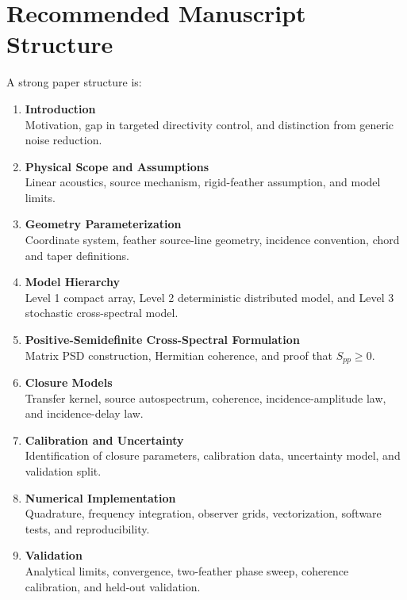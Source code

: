 \documentclass[11pt]{article}
\begin{document}
\section{Recommended Manuscript Structure}

A strong paper structure is:

\begin{enumerate}
    \item \textbf{Introduction}\\
    Motivation, gap in targeted directivity control, and distinction from generic noise reduction.

    \item \textbf{Physical Scope and Assumptions}\\
    Linear acoustics, source mechanism, rigid-feather assumption, and model limits.

    \item \textbf{Geometry Parameterization}\\
    Coordinate system, feather source-line geometry, incidence convention, chord and taper definitions.

    \item \textbf{Model Hierarchy}\\
    Level 1 compact array, Level 2 deterministic distributed model, and Level 3 stochastic cross-spectral model.

    \item \textbf{Positive-Semidefinite Cross-Spectral Formulation}\\
    Matrix PSD construction, Hermitian coherence, and proof that $S_{pp}\geq0$.

    \item \textbf{Closure Models}\\
    Transfer kernel, source autospectrum, coherence, incidence-amplitude law, and incidence-delay law.

    \item \textbf{Calibration and Uncertainty}\\
    Identification of closure parameters, calibration data, uncertainty model, and validation split.

    \item \textbf{Numerical Implementation}\\
    Quadrature, frequency integration, observer grids, vectorization, software tests, and reproducibility.

    \item \textbf{Validation}\\
    Analytical limits, convergence, two-feather phase sweep, coherence calibration, and held-out validation.


\end{enumerate}
\end{document}
